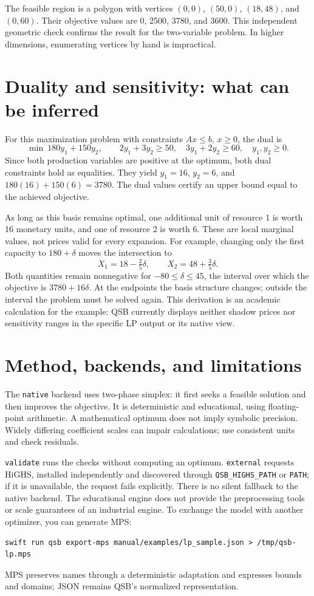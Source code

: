 The feasible region is a polygon with vertices \((0,0)\), \((50,0)\),
\((18,48)\), and \((0,60)\). Their objective values are 0, 2500, 3780, and 3600.
This independent geometric check confirms the result for the two-variable
problem. In higher dimensions, enumerating vertices by hand is impractical.

\section{Duality and sensitivity: what can be inferred}
For this maximization problem with constraints \(Ax\leq b\), \(x\geq0\), the dual is
\[
 \min\ 180y_1+150y_2,\qquad
 2y_1+3y_2\geq50,\quad3y_1+2y_2\geq60,\quad y_1,y_2\geq0.
\]
Since both production variables are positive at the optimum, both dual
constraints hold as equalities. They yield
\(y_1=16\), \(y_2=6\), and \(180(16)+150(6)=3780\). The dual values
certify an upper bound equal to the achieved objective.

As long as this basis remains optimal, one additional unit of resource 1
is worth 16 monetary units, and one of resource 2 is worth 6. These are local
marginal values, not prices valid for every expansion. For example, changing
only the first capacity to \(180+\delta\) moves the intersection to
\[
 X_1=18-\tfrac25\delta,\qquad X_2=48+\tfrac35\delta.
\]
Both quantities remain nonnegative for
\(-80\leq\delta\leq45\), the interval over which the objective is
\(3780+16\delta\). At the endpoints the basis structure changes;
outside the interval the problem must be solved again. This derivation is an
academic calculation for the example: QSB currently displays neither shadow
prices nor sensitivity ranges in the specific LP output or its native view.

\section{Method, backends, and limitations}
The \texttt{native} backend uses two-phase simplex: it first seeks a feasible
solution and then improves the objective. It is deterministic and educational,
using floating-point arithmetic. A mathematical optimum does not imply
symbolic precision. Widely differing coefficient scales can impair
calculations; use consistent units and check residuals.

\texttt{validate} runs the checks without computing an optimum.
\texttt{external} requests HiGHS, installed independently and discovered
through \texttt{QSB\_HIGHS\_PATH} or \texttt{PATH}; if it is unavailable, the
request fails explicitly. There is no silent fallback to the native backend.
The educational engine does not provide the preprocessing tools or scale
guarantees of an industrial engine. To exchange the model with another
optimizer, you can generate MPS:
\begin{lstlisting}
swift run qsb export-mps manual/examples/lp_sample.json > /tmp/qsb-lp.mps
\end{lstlisting}
MPS preserves names through a deterministic adaptation and expresses bounds
and domains; JSON remains QSB's normalized representation.

